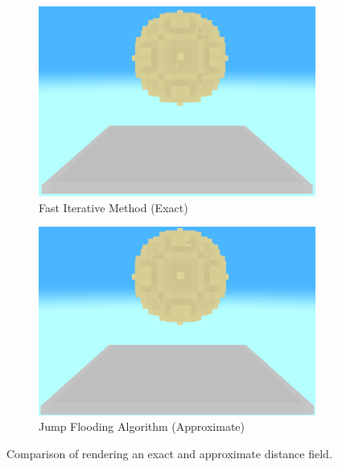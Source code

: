 \begin{figure}[htbp]
    \centering
    \begin{subfigure}[t]{0.49\textwidth}
        \centering
        \includegraphics[width=\textwidth]{figures/demo_fim.png}
        \caption{Fast Iterative Method (Exact)}
    \end{subfigure}
    \hfill
    \begin{subfigure}[t]{0.49\textwidth}
        \centering
        \includegraphics[width=\textwidth]{figures/demo_jfa.png}
        \caption{Jump Flooding Algorithm (Approximate)}
    \end{subfigure}
    \caption{Comparison of rendering an exact and approximate distance field.}
    \label{fig:fim_jfa_comp}
\end{figure}

